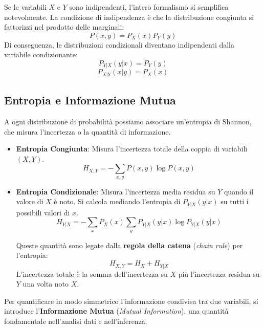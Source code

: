 Se le variabili $X$ e $Y$ sono indipendenti, l'intero formalismo si semplifica notevolmente. La condizione di indipendenza è che la distribuzione congiunta si fattorizzi nel prodotto delle marginali:
\begin{equation}
P(x,y) = P_X(x) P_Y(y)
\end{equation}
Di conseguenza, le distribuzioni condizionali diventano indipendenti dalla variabile condizionante:
\begin{equation}
P_{Y|X}(y|x) = P_Y(y)
\end{equation}
\begin{equation}
P_{X|Y}(x|y) = P_X(x)
\end{equation}

\subsection{Entropia e Informazione Mutua}

A ogni distribuzione di probabilità possiamo associare un'entropia di Shannon, che misura l'incertezza o la quantità di informazione.

\begin{itemize}
    \item \textbf{Entropia Congiunta}: Misura l'incertezza totale della coppia di variabili $(X,Y)$.
    \begin{equation}
    H_{X,Y} = -\sum_{x,y} P(x,y) \log P(x,y)
    \end{equation}
    
    \item \textbf{Entropia Condizionale}: Misura l'incertezza media residua su $Y$ quando il valore di $X$ è noto. Si calcola mediando l'entropia di $P_{Y|X}(y|x)$ su tutti i possibili valori di $x$.
    \begin{equation}
    H_{Y|X} = -\sum_x P_X(x) \sum_y P_{Y|X}(y|x) \log P_{Y|X}(y|x)
    \end{equation}
    
    Queste quantità sono legate dalla \textbf{regola della catena} (\textit{chain rule}) per l'entropia:
    \begin{equation}
    H_{X,Y} = H_X + H_{Y|X}
    \end{equation}
    L'incertezza totale è la somma dell'incertezza su $X$ più l'incertezza residua su $Y$ una volta noto $X$.
\end{itemize}

Per quantificare in modo simmetrico l'informazione condivisa tra due variabili, si introduce l'\textbf{Informazione Mutua} (\textit{Mutual Information}), una quantità fondamentale nell'analisi dati e nell'inferenza.

